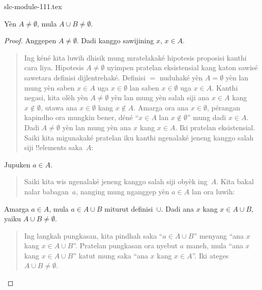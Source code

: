 \begin{filecontents*}[overwrite]{slc-module-111.tex}
\begin{prop}
Yèn $A \neq \emptyset$, mula $A \cup B \neq \emptyset$.
\end{prop}

\begin{proof}
  Anggepen $A \neq \emptyset$. Dadi kanggo sawijining $x$,
  $x \in A$.
  \begin{quote}
    Ing kéné kita luwih dhisik mung mratelakaké hipotesis
    proposisi kanthi cara liya. Hipotesis $A \neq \emptyset$
    nyimpen pratelan eksistensial kang katon sawisé sawetara
    definisi dijlentrehaké. Definisi $=$ nuduhaké yèn
    $A = \emptyset$ yèn lan mung yèn saben $x \in A$
    uga $x \in \emptyset$ lan saben $x \in \emptyset$
    uga $x \in A$. Kanthi negasi, kita olèh yèn $A \neq
    \emptyset$ yèn lan mung yèn salah siji ana $x \in A$ kang
    $x \notin \emptyset$, utawa ana $x \in \emptyset$
    kang $x \notin A$. Amarga ora ana $x \in \emptyset$,
    pérangan kapindho ora mungkin bener, déné ``$x \in A$
    lan $x \notin \emptyset$'' mung dadi $x \in A$.
    Dadi $A \neq \emptyset$ yèn lan mung yèn ana $x$
    kang $x \in A$. Iki pratelan eksistensial. Saiki
    kita migunakaké pratelan iku kanthi ngenalaké jeneng
    kanggo salah siji !!{element}s saka~$A$:
  \end{quote}
  Jupuken $a \in A$.
  \begin{quote}
    Saiki kita wis ngenalaké jeneng kanggo salah siji
    obyèk ing~$A$. Kita bakal nalar babagan~$a$, nanging
    mung nganggep yèn $a \in A$ lan ora luwih:
  \end{quote}
  Amarga $a \in A$, mula $a \in A \cup B$ miturut
  definisi~$\cup$. Dadi ana $x$ kang $x \in A \cup B$,
  yaiku $A \cup B \neq \emptyset$.
  \begin{quote}
    Ing langkah pungkasan, kita pindhah saka ``$a \in A \cup B$''
    menyang ``ana $x$ kang $x \in A \cup B$''.
    Pratelan pungkasan ora nyebut $a$ maneh, mula
    ``ana $x$ kang $x \in A \cup B$'' katut mung saka
    ``ana $x$ kang $x \in A$''. Iki ateges $A \cup B \neq
    \emptyset$.
  \end{quote}
\end{proof}


\end{filecontents*}
